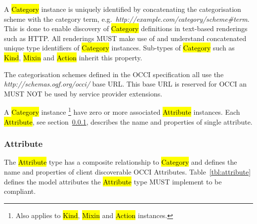 \documentclass[10pt,a4paper]{article}
\begin{document}

A \hl{Category} instance is uniquely identified by concatenating the
categorisation scheme with the category term,
e.g.~\textit{http://example.com/category/scheme\#term}.  This is done
to enable discovery of \hl{Category} definitions in text-based
renderings such as HTTP. All renderings MUST make use of and
understand concatenated unique type identifiers of \hl{Category}
instances.
%
Sub-types of \hl{Category} such as \hl{Kind}, \hl{Mixin} and \hl{Action} inherit
this property.

The categorisation schemes defined in the OCCI specification all use
the \textit{http://schemas.ogf.org/occi/} base URL. This base URL is
reserved for OCCI an MUST NOT be used by service provider extensions.

A \hl{Category} instance%
\footnote{Also applies to \hl{Kind}, \hl{Mixin} and \hl{Action} instances.}
have zero or more associated \hl{Attribute} instances.
Each \hl{Attribute}, see section~\ref{sec:attribute},
describes the name and properties of single attribute.


\subsubsection{Attribute}
\label{sec:attribute}

The \hl{Attribute} type has a composite relationship to \hl{Category} and
defines the name and properties of client discoverable OCCI Attributes.
%
Table~\ref{tbl:attribute} defines the model attributes the \hl{Attribute} type
MUST implement to be compliant.
\end{document}
